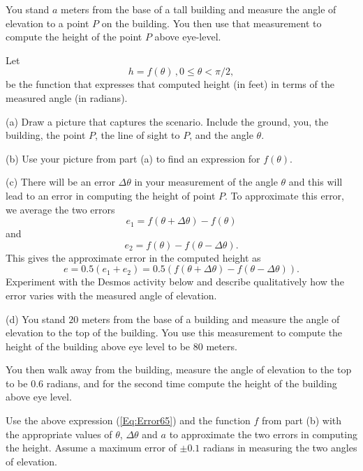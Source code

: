 \documentclass{ximera}
\begin{document}
\begin{question} \label{Q1:RightTriangle}
You stand $a$ meters from the base of a tall building and measure the angle of  elevation to a point $P$ on the building. You then use that measurement to compute the height of the point $P$ above eye-level.

Let 
\[
    h = f(\theta) \, , 0\leq \theta < \pi/2 ,
\]
be the function that expresses that computed height (in feet) in terms of the measured angle (in radians).

(a) Draw a picture that captures the scenario. Include the ground, you, the building, the point $P$, the line of sight to $P$, and the angle $\theta$.

(b) Use your picture from part (a) to find an expression for $f(\theta)$.

(c) There will be an error $\Delta \theta$ in your measurement of the angle $\theta$ and this will lead to an error in computing the height of point $P$.  To approximate this error, we average the two errors
\[
     e_1 = f(\theta + \Delta\theta) - f(\theta)
\]
and 
\[
   e_2 = f(\theta) - f(\theta - \Delta\theta).
\]
This gives the approximate error in the computed height as
\begin{equation}
   e =   0.5 (e_1 + e_2) = 0.5 \left(  f(\theta + \Delta\theta) - f(\theta - \Delta\theta)     \right) . \label{Eq:Error65}
\end{equation}
Experiment with the Desmos activity below and describe qualitatively how the error varies with the measured angle of elevation.

(d) You stand $20$ meters from the base of a building and measure the angle of elevation to the top of the building. You use this measurement to compute the height of the building above eye level to be $80$ meters. 

You then walk away from the building, measure the angle of elevation to the top to be $0.6$ radians, and for the second time compute the height of the building above eye level.

Use the above expression (\ref{Eq:Error65}) and the function $f$ from part (b) with the appropriate values of $\theta$, $\Delta\theta$ and $a$ to approximate the two errors in computing the height. Assume a maximum error of $\pm 0.1$ radians in measuring the two angles of elevation. 


\begin{exploration}

 
\begin{onlineOnly}
    \begin{center}
\end{center}
\end{onlineOnly}
\end{exploration} 

\end{question}
\end{document}
